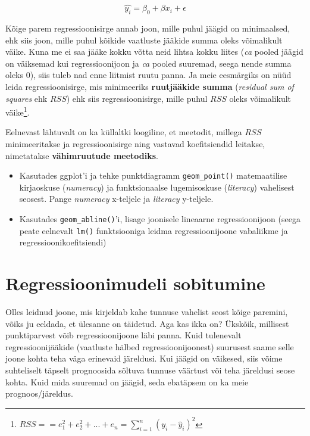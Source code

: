 \documentclass[
]{book}
\providecommand{\tightlist}{%
  \setlength{\itemsep}{0pt}\setlength{\parskip}{0pt}}
\begin{document}
\begin{equation}
\hat{y_i}=\beta_0+\beta x_i+\epsilon
\end{equation}

Kõige parem regressioonisirge annab joon, mille puhul jäägid on minimaalsed, ehk siis joon, mille puhul kõikide vaatluste jääkide summa oleks võimalikult väike. Kuna me ei saa jääke kokku võtta neid lihtsa kokku liites (\emph{ca} pooled jäägid on väiksemad kui regressioonijoon ja \emph{ca} pooled suuremad, seega nende summa oleks \(0\)), siis tuleb nad enne liitmist ruutu panna. Ja meie eesmärgiks on nüüd leida regressioonisirge, mis minimeeriks \textbf{ruutjääkide summa} (\emph{residual sum of squares} ehk \(RSS\)) ehk siis regressioonisirge, mille puhul \(RSS\) oleks võimalikult väike\footnote{\(RSS= = e_1^2 + e_2^2 + ... + e_n = \sum_{i=1}^{n}(y_i-\hat{y}_i)^2\)}.

Eelnevast lähtuvalt on ka küllaltki loogiline, et meetodit, millega \(RSS\) minimeeritakse ja regressioonisirge ning vastavad koefitsiendid leitakse, nimetatakse \textbf{vähimruutude meetodiks}.

\begin{itemize}
\tightlist
\item
  Kasutades ggplot'i ja tehke punktdiagramm \texttt{geom\_point()} matemaatilise kirjaoskuse (\emph{numeracy}) ja funktsionaalse lugemisoskuse (\emph{literacy}) vahelisest seosest. Pange \emph{numeracy} x-teljele ja \emph{literacy} y-teljele.\\
\item
  Kasutades \texttt{geom\_abline()}'i, lisage joonisele lineaarne regressioonijoon (seega peate eelnevalt \texttt{lm()} funktsiooniga leidma regressioonijoone vabaliikme ja regressioonikoefitsiendi)
\end{itemize}

\color{black}

\hypertarget{regressioonimudeli-sobitumine}{%
\section{Regressioonimudeli sobitumine}\label{regressioonimudeli-sobitumine}}

Olles leidnud joone, mis kirjeldab kahe tunnuse vahelist seost kõige paremini, võiks ju eeldada, et ülesanne on täidetud. Aga kas ikka on? Ükskõik, millisest punktiparvest võib regressioonijoone läbi panna. Kuid tulenevalt regressioonijääkide (vaatluste hälbed regressioonijoonest) suurusest saame selle joone kohta teha väga erinevaid järeldusi. Kui jäägid on väikesed, siis võime suhteliselt täpselt prognoosida sõltuva tunnuse väärtust või teha järeldusi seose kohta. Kuid mida suuremad on jäägid, seda ebatäpsem on ka meie prognoos/järeldus.
\end{document}
